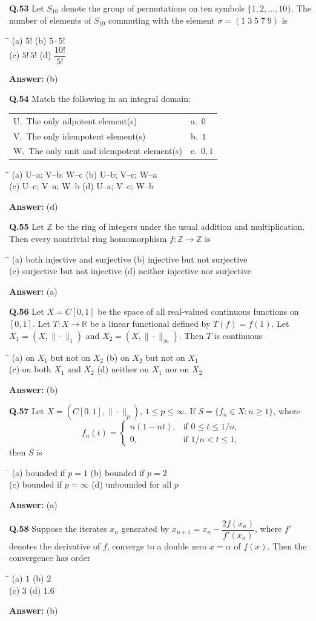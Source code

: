 \documentclass[11pt,a4paper]{article}
\newcommand{\optsfour}[4]{%
  \begin{tabbing}
    \hspace{0.48\linewidth}\=\kill
    (a) #1 \> (b) #2 \\[2pt]
    (c) #3 \> (d) #4
  \end{tabbing}%
}
\newcommand{\ans}[1]{\textbf{Answer:} #1\par\medskip}
\begin{document}
\textbf{Q.53} Let $S_{10}$ denote the group of permutations on ten symbols $\{1, 2, \dots, 10\}$. The number of elements of $S_{10}$ commuting with the element $\sigma = (1\;3\;5\;7\;9)$ is
\optsfour{$5!$}{$5 \cdot 5!$}{$5!\,5!$}{$\dfrac{10!}{5!}$}
\ans{(b)}

\textbf{Q.54} Match the following in an integral domain:
\begin{center}
\begin{tabular}{ll}
  \toprule
  U.\ The only nilpotent element(s) & a.\ $0$ \\
  V.\ The only idempotent element(s) & b.\ $1$ \\
  W.\ The only unit and idempotent element(s) & c.\ $0, 1$ \\
  \bottomrule
\end{tabular}
\end{center}
\optsfour{U--a; V--b; W--c}{U--b; V--c; W--a}{U--c; V--a; W--b}{U--a; V--c; W--b}
\ans{(d)}

\textbf{Q.55} Let $\mathbb{Z}$ be the ring of integers under the usual addition and multiplication. Then every nontrivial ring homomorphism $f : \mathbb{Z} \to \mathbb{Z}$ is
\optsfour{both injective and surjective}{injective but not surjective}{surjective but not injective}{neither injective nor surjective}
\ans{(a)}

\textbf{Q.56} Let $X = C[0,1]$ be the space of all real-valued continuous functions on $[0,1]$. Let $T : X \to \mathbb{R}$ be a linear functional defined by $T(f) = f(1)$. Let $X_1 = (X, \|\cdot\|_1)$ and $X_2 = (X, \|\cdot\|_\infty)$. Then $T$ is continuous
\optsfour{on $X_1$ but not on $X_2$}{on $X_2$ but not on $X_1$}{on both $X_1$ and $X_2$}{neither on $X_1$ nor on $X_2$}
\ans{(b)}

\textbf{Q.57} Let $X = (C[0,1], \|\cdot\|_p)$, $1 \le p \le \infty$. If $S = \{f_n \in X : n \ge 1\}$, where
\[
  f_n(t) = \begin{cases} n(1 - nt), & \text{if } 0 \le t \le 1/n, \\ 0, & \text{if } 1/n < t \le 1, \end{cases}
\]
then $S$ is
\optsfour{bounded if $p = 1$}{bounded if $p = 2$}{bounded if $p = \infty$}{unbounded for all $p$}
\ans{(a)}

\textbf{Q.58} Suppose the iterates $x_n$ generated by $x_{n+1} = x_n - \dfrac{2f(x_n)}{f'(x_n)}$, where $f'$ denotes the derivative of $f$, converge to a double zero $x = \alpha$ of $f(x)$. Then the convergence has order
\optsfour{$1$}{$2$}{$3$}{$1.6$}
\ans{(b)}
\end{document}
